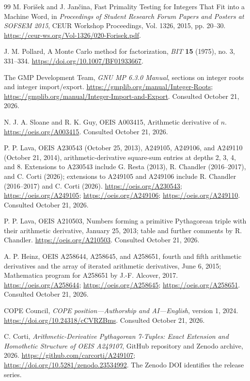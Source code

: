\documentclass[11pt,a4paper]{article}
\theoremstyle{definition}
\theoremstyle{remark}
\begin{document}
\begin{thebibliography}{99}
M. Fori\v{s}ek and J. Jan\v{c}ina, Fast Primality Testing for Integers That
Fit into a Machine Word, in \emph{Proceedings of Student Research Forum
Papers and Posters at SOFSEM 2015}, CEUR Workshop Proceedings,
Vol. 1326, 2015, pp. 20--30.
\url{https://ceur-ws.org/Vol-1326/020-Forisek.pdf}.

J. M. Pollard, A Monte Carlo method for factorization,
\emph{BIT} \textbf{15} (1975), no. 3, 331--334.
\url{https://doi.org/10.1007/BF01933667}.

The GMP Development Team, \emph{GNU MP 6.3.0 Manual}, sections on integer
roots and integer import/export.
\url{https://gmplib.org/manual/Integer-Roots};
\url{https://gmplib.org/manual/Integer-Import-and-Export}.
Consulted October 21, 2026.

N. J. A. Sloane and R. K. Guy, OEIS A003415, Arithmetic derivative of $n$.
\url{https://oeis.org/A003415}. Consulted October 21, 2026.

P. P. Lava, OEIS A230543 (October 25, 2013), A249105, A249106, and A249110
(October 21, 2014), arithmetic-derivative square-sum entries at depths
2, 3, 4, and 8. Extensions to A230543 include G. Resta (2013),
R. Chandler (2016--2017), and C. Corti (2026); extensions to A249105 and
A249106 include R. Chandler (2016--2017) and C. Corti (2026).
\url{https://oeis.org/A230543}; \url{https://oeis.org/A249105};
\url{https://oeis.org/A249106}; \url{https://oeis.org/A249110}.
Consulted October 21, 2026.

P. P. Lava, OEIS A210503, Numbers forming a primitive Pythagorean triple
with their arithmetic derivative, January 25, 2013; table and further
comments by R. Chandler.
\url{https://oeis.org/A210503}. Consulted October 21, 2026.

A. P. Heinz, OEIS A258644, A258645, and A258651, fourth and fifth
arithmetic derivatives and the array of iterated arithmetic derivatives,
June 6, 2015; Mathematica program for A258651 by J.-F. Alcover, 2017.
\url{https://oeis.org/A258644}; \url{https://oeis.org/A258645};
\url{https://oeis.org/A258651}. Consulted October 21, 2026.

COPE Council, \emph{COPE position---Authorship and AI---English},
version 1, 2024. \url{https://doi.org/10.24318/cCVRZBms}.
Consulted October 21, 2026.

C. Corti, \emph{Arithmetic-Derivative Pythagorean 7-Tuples: Exact Extension
and Homothetic Structure of OEIS A249107}, GitHub repository and Zenodo archive,
2026. \url{https://github.com/carcorti/A249107};
\url{https://doi.org/10.5281/zenodo.23534992}.
The Zenodo DOI identifies the release series.

\end{thebibliography}
\end{document}

